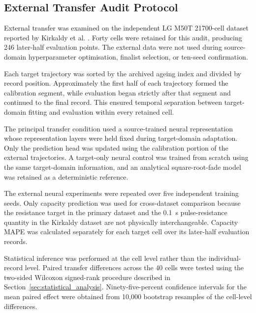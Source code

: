 \documentclass[a4paper,fleqn]{cas-sc}
\begin{document}

\subsection{External Transfer Audit Protocol}
\label{sec:transfer_protocol}

External transfer was examined on the independent LG M50T 21700-cell dataset reported by Kirkaldy et al. \cite{kirkaldy2024dataset}. Forty cells were retained for this audit, producing 246 later-half evaluation points. The external data were not used during source-domain hyperparameter optimisation, finalist selection, or ten-seed confirmation.

Each target trajectory was sorted by the archived ageing index and divided by record position. Approximately the first half of each trajectory formed the calibration segment, while evaluation began strictly after that segment and continued to the final record. This ensured temporal separation between target-domain fitting and evaluation within every retained cell.

The principal transfer condition used a source-trained neural representation whose representation layers were held fixed during target-domain adaptation. Only the prediction head was updated using the calibration portion of the external trajectories. A target-only neural control was trained from scratch using the same target-domain information, and an analytical square-root-fade model was retained as a deterministic reference.

The external neural experiments were repeated over five independent training seeds. Only capacity prediction was used for cross-dataset comparison because the resistance target in the primary dataset and the 0.1~s pulse-resistance quantity in the Kirkaldy dataset are not physically interchangeable. Capacity MAPE was calculated separately for each target cell over its later-half evaluation records.

Statistical inference was performed at the cell level rather than the individual-record level. Paired transfer differences across the 40 cells were tested using the two-sided Wilcoxon signed-rank procedure described in Section~\ref{sec:statistical_analysis}. Ninety-five-percent confidence intervals for the mean paired effect were obtained from 10,000 bootstrap resamples of the cell-level differences.
\end{document}
